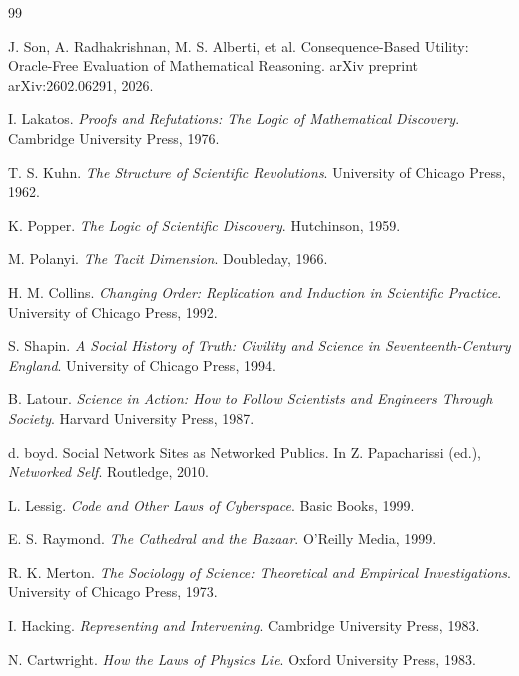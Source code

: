 \documentclass[12pt]{article}
\begin{document}
\newpage
\begin{thebibliography}{99}

J. Son, A. Radhakrishnan, M. S. Alberti, et al.
\newblock Consequence-Based Utility: Oracle-Free Evaluation of Mathematical Reasoning.
\newblock arXiv preprint arXiv:2602.06291, 2026.

I. Lakatos.
\newblock \emph{Proofs and Refutations: The Logic of Mathematical Discovery}.
\newblock Cambridge University Press, 1976.

T. S. Kuhn.
\newblock \emph{The Structure of Scientific Revolutions}.
\newblock University of Chicago Press, 1962.

K. Popper.
\newblock \emph{The Logic of Scientific Discovery}.
\newblock Hutchinson, 1959.

M. Polanyi.
\newblock \emph{The Tacit Dimension}.
\newblock Doubleday, 1966.

H. M. Collins.
\newblock \emph{Changing Order: Replication and Induction in Scientific Practice}.
\newblock University of Chicago Press, 1992.

S. Shapin.
\newblock \emph{A Social History of Truth: Civility and Science in Seventeenth-Century England}.
\newblock University of Chicago Press, 1994.

B. Latour.
\newblock \emph{Science in Action: How to Follow Scientists and Engineers Through Society}.
\newblock Harvard University Press, 1987.

d. boyd.
\newblock Social Network Sites as Networked Publics.
\newblock In Z. Papacharissi (ed.), \emph{Networked Self}. Routledge, 2010.

L. Lessig.
\newblock \emph{Code and Other Laws of Cyberspace}.
\newblock Basic Books, 1999.

E. S. Raymond.
\newblock \emph{The Cathedral and the Bazaar}.
\newblock O'Reilly Media, 1999.

R. K. Merton.
\newblock \emph{The Sociology of Science: Theoretical and Empirical Investigations}.
\newblock University of Chicago Press, 1973.

I. Hacking.
\newblock \emph{Representing and Intervening}.
\newblock Cambridge University Press, 1983.

N. Cartwright.
\newblock \emph{How the Laws of Physics Lie}.
\newblock Oxford University Press, 1983.


\end{thebibliography}
\end{document}
